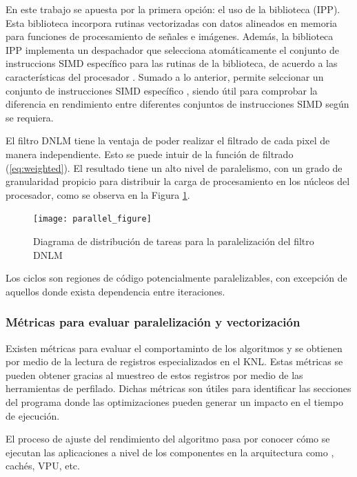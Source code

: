{En este trabajo se apuesta por la primera opci\'on: el uso de la biblioteca  (IPP). Esta biblioteca incorpora rutinas vectorizadas con datos alineados en memoria para funciones de procesamiento de se\~nales e im\'agenes. Adem\'as, la biblioteca IPP implementa un despachador que selecciona atom\'aticamente el conjunto de instruccions SIMD espec\'ifico para las rutinas de la biblioteca, de acuerdo a las caracter\'isticas del procesador \cite{IntelCorporation2017}.  Sumado a lo anterior, permite selccionar un conjunto de instrucciones SIMD espec\'ifico \cite{IntelCorporation2017}, siendo \'util para comprobar la diferencia en rendimiento entre diferentes conjuntos de instrucciones SIMD seg\'un se requiera.

El filtro DNLM tiene la ventaja de poder realizar el filtrado de cada pixel de manera independiente. Esto se puede intuir de la funci\'on de filtrado (\ref{eq:weighted}). El resultado tiene un alto nivel de paralelismo, con un grado de granularidad propicio para distribuir la carga de procesamiento en los n\'ucleos del procesador, como se observa en la Figura \ref{fig:parallel_figure}. 



\begin{figure}[H]
   \centering
   \caption[Diagrama de distribuci\'on de tareas paralelas]{Diagrama de distribuci\'on de tareas para la paralelizaci\'on del filtro DNLM}
   \texttt{[image: parallel\_figure]}
   \label{fig:parallel_figure}
 \end{figure}
 
 
 Los ciclos son regiones de c\'odigo potencialmente paralelizables, con excepci\'on de aquellos donde exista dependencia entre iteraciones. 
 
\subsubsection{M\'etricas para evaluar paralelizaci\'on y vectorizaci\'on}
 
Existen m\'etricas para evaluar el comportaminto de los algoritmos y se obtienen por medio de la lectura de registros especializados en el KNL. Estas m\'etricas se pueden obtener gracias al muestreo de estos registros por medio de las herramientas de perfilado. Dichas m\'etricas son \'utiles para identificar las secciones del programa donde las optimizaciones pueden generar un impacto en el tiempo de ejecuci\'on.

El proceso de ajuste del rendimiento del algoritmo pasa por conocer c\'omo se ejecutan las aplicaciones a nivel de los componentes en la arquitectura como , cach\'es, VPU, etc.

}
